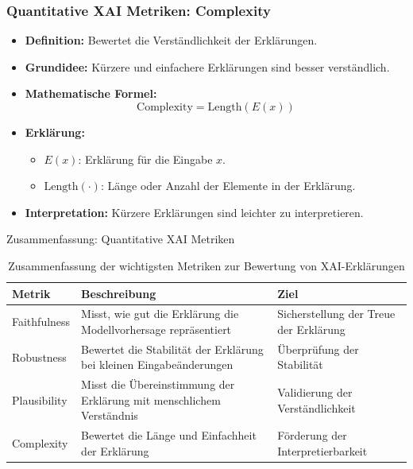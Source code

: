 \documentclass[aspectratio=1610, xcolor=dvipsnames, 9pt]{beamer}
\begin{document}
\begin{frame}
  \frametitle{Quantitative XAI Metriken: Complexity}
  \begin{itemize}
    \item \textbf{Definition:} Bewertet die Verständlichkeit der Erklärungen.
    \item \textbf{Grundidee:} Kürzere und einfachere Erklärungen sind besser verständlich.
    \item \textbf{Mathematische Formel:}
    \[
    \text{Complexity} = \text{Length}(E(x))
    \]
    \item \textbf{Erklärung:}
    \begin{itemize}
      \item $E(x)$: Erklärung für die Eingabe $x$.
      \item $\text{Length}(\cdot)$: Länge oder Anzahl der Elemente in der Erklärung.
    \end{itemize}
    \item \textbf{Interpretation:} Kürzere Erklärungen sind leichter zu interpretieren.
  \end{itemize}
\end{frame}

\begin{frame}{Zusammenfassung: Quantitative XAI Metriken}
  \begin{table}[]
    \centering
    \begin{tabular}{|p{3cm}|p{4cm}|p{4cm}|}
      \hline
      \textbf{Metrik} & \textbf{Beschreibung} & \textbf{Ziel} \\ \hline
      Faithfulness & Misst, wie gut die Erklärung die Modellvorhersage repräsentiert & Sicherstellung der Treue der Erklärung \\ \hline
      Robustness & Bewertet die Stabilität der Erklärung bei kleinen Eingabeänderungen & Überprüfung der Stabilität \\ \hline
      Plausibility & Misst die Übereinstimmung der Erklärung mit menschlichem Verständnis & Validierung der Verständlichkeit \\ \hline
      Complexity & Bewertet die Länge und Einfachheit der Erklärung & Förderung der Interpretierbarkeit \\ \hline
    \end{tabular}
    \caption{Zusammenfassung der wichtigsten Metriken zur Bewertung von XAI-Erklärungen}
  \end{table}
\end{frame}
\end{document}
